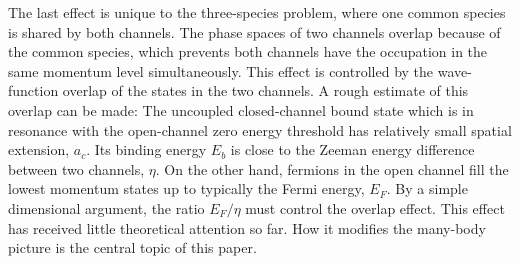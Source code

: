\documentclass[reprint,pra]{revtex4-1}
\providecommand{\abs}[1]{\ensuremath{\left\lvert{#1}\right\rvert}}
\begin{document}
The last effect is unique to the three-species problem, where one common species is shared by both channels.  The phase spaces of two channels overlap because of  the common species, which prevents both channels have the occupation in the same momentum level simultaneously. This effect is controlled by the wave-function overlap of the states in the two channels. A rough estimate of this overlap can be made: The uncoupled closed-channel bound state which is in resonance with the open-channel zero energy threshold has  relatively small  spatial extension, $a_c$.  Its binding energy $E_b$ is close to the Zeeman energy difference between two channels, $\eta$.  On the other hand, fermions in the open channel fill the lowest  momentum states up to typically the Fermi energy, $E_F$.  By a simple dimensional argument, the ratio $E_F/\eta$ must control the overlap effect. This effect has received little theoretical attention so far.  How it modifies the many-body picture is the central topic of this paper. 

\end{document}
